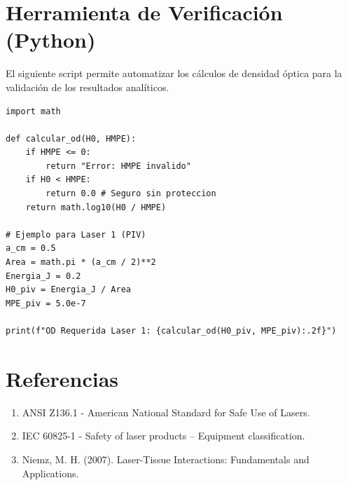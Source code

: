 \documentclass[11pt, a4paper]{article}
\begin{document}
\newpage
\appendix
\section{Herramienta de Verificación (Python)}
El siguiente script permite automatizar los cálculos de densidad óptica para la validación de los resultados analíticos.

\begin{lstlisting}
import math

def calcular_od(H0, HMPE):
    if HMPE <= 0:
        return "Error: HMPE invalido"
    if H0 < HMPE:
        return 0.0 # Seguro sin proteccion
    return math.log10(H0 / HMPE)

# Ejemplo para Laser 1 (PIV)
a_cm = 0.5 
Area = math.pi * (a_cm / 2)**2
Energia_J = 0.2
H0_piv = Energia_J / Area
MPE_piv = 5.0e-7

print(f"OD Requerida Laser 1: {calcular_od(H0_piv, MPE_piv):.2f}")
\end{lstlisting}

\section{Referencias}
\begin{enumerate}
	\item ANSI Z136.1 - American National Standard for Safe Use of Lasers.
	\item IEC 60825-1 - Safety of laser products – Equipment classification.
	\item Niemz, M. H. (2007). Laser-Tissue Interactions: Fundamentals and Applications.
\end{enumerate}
\end{document}

